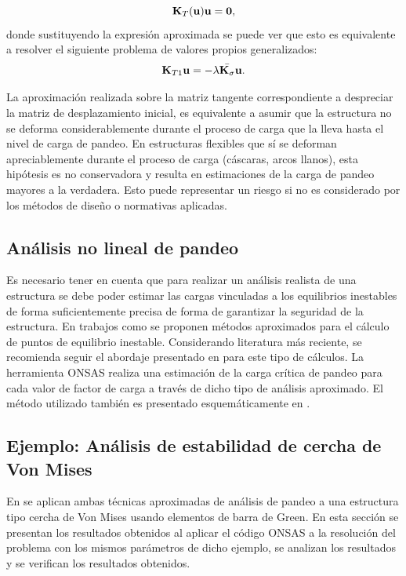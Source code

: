\begin{equation}
{\bf K}_{T}({\bf u}) {\bf u} = \boldsymbol{0},
\end{equation}
%
donde sustituyendo la expresión aproximada se puede ver que esto es equivalente a resolver el siguiente problema de valores propios generalizados:
%
\begin{equation}
{\bf K}_{T1} {\bf u} = -\lambda \bar{ {\bf K}_\sigma } {\bf u}.
\end{equation}

La aproximación realizada sobre la matriz tangente correspondiente a despreciar la matriz de desplazamiento inicial, es equivalente a asumir que la estructura no se deforma considerablemente durante el proceso de carga que la lleva hasta el nivel de carga de pandeo. %
%
En estructuras flexibles que sí se deforman apreciablemente durante el proceso de carga (cáscaras, arcos llanos), esta hipótesis es no conservadora y resulta en estimaciones de la carga de pandeo mayores a la verdadera. Esto puede representar un riesgo si no  es considerado por los métodos de diseño o normativas aplicadas.


\subsection{Análisis no lineal de pandeo}

Es necesario tener en cuenta que para realizar un análisis realista de una estructura se debe poder estimar las cargas vinculadas a los equilibrios inestables de forma suficientemente precisa de forma de garantizar la seguridad de la estructura. %
%
En trabajos como \citep{Wriggers1990} se proponen métodos aproximados para el cálculo de puntos de equilibrio inestable. %
%
Considerando literatura más reciente, se recomienda seguir el abordaje presentado en \citep{Bathe2014} para este tipo de cálculos. %
%
La herramienta ONSAS realiza una estimación de la carga crítica de pandeo para cada valor de factor de carga a través de dicho tipo de análisis aproximado. %
%
El método utilizado también es presentado esquemáticamente en \citep{Li2017}.

\subsection{Ejemplo: Análisis de estabilidad de cercha de Von Mises}

En \citep{Li2017} se aplican ambas técnicas aproximadas de análisis de pandeo a una estructura tipo cercha de Von Mises usando elementos de barra de Green. %
%
En esta sección se presentan los resultados obtenidos al aplicar el código ONSAS a la resolución del problema con los mismos parámetros de dicho ejemplo, se analizan los resultados y se verifican los resultados obtenidos. %
%

